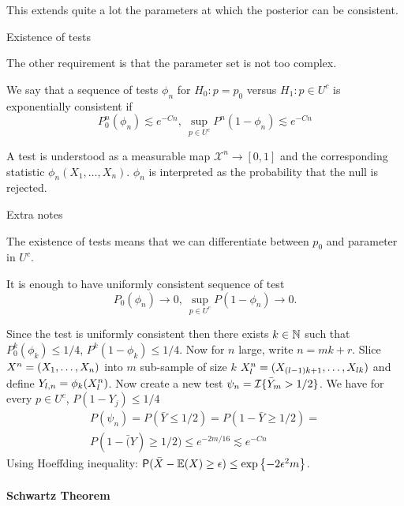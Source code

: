 This extends quite a lot the parameters at which the posterior can be consistent. 







{Existence of tests}

The other requirement is that the parameter set is not too complex.   

\begin{definition}
We say that a sequence of tests $\phi_n$ for $H_0: p = p_0$ versus $H_1: p \in U^c$ is exponentially consistent if 
$$
P_0^n(\phi_n) \lesssim e^{-Cn}, ~ \sup_{p\in U^c} P^n(1-\phi_n) \lesssim e^{-Cn} 
$$
\end{definition}
A test is understood as a measurable map $\mathcal{X}^n \to [0,1]$ and the corresponding statistic $\phi_n(X_1, \dots, X_n)$. $\phi_n$ is interpreted as the probability that the null is rejected. 









{Extra notes}

	The existence of tests means that we can differentiate between $p_0$ and parameter in $U^c$. 

	It is enough to have uniformly consistent sequence of test 
	$$
P_0(\phi_n) \to 0, ~ \sup_{p\in U^c} P(1-\phi_n) \to 0. 
	$$

Since the test is uniformly consistent then there exists $k\in \mathbb{N}$ such that $P_0^k(\phi_k) \leq 1/4$, $P^k(1-\phi_k) \leq 1/4$. Now for $n$ large, write $n = mk+r$. Slice $X^n = (X_1, \dots, X_n)$ into $m$ sub-sample of size $k$ $X^n_l = (X_{(l-1)k+1},\dots, X_{lk})$ and define $Y_{l,n} = \phi_k(X^n_l)$. Now create a new test $\psi_n = \mathcal{I}\{\bar{Y}_m > 1/2\}$. We have for every $p \in U^c$, $P(1-Y_j) \leq 1/4$
\begin{multline*}
P(\psi_n) = P(\bar{Y} \leq 1/2) = P(1-\bar{Y} \geq 1/2) = \\ 
P(1-\bar(Y) \geq 1/2) \leq e^{-2m/16} \lesssim e^{-Cn}
\end{multline*}
Using Hoeffding inequality: $\mathsf{P}(\bar{X} - \mathbb{E}(X) \geq \epsilon ) \leq \exp\left\{ - 2 \epsilon^2 m \right\}$.





\paragraph{Schwartz Theorem}

